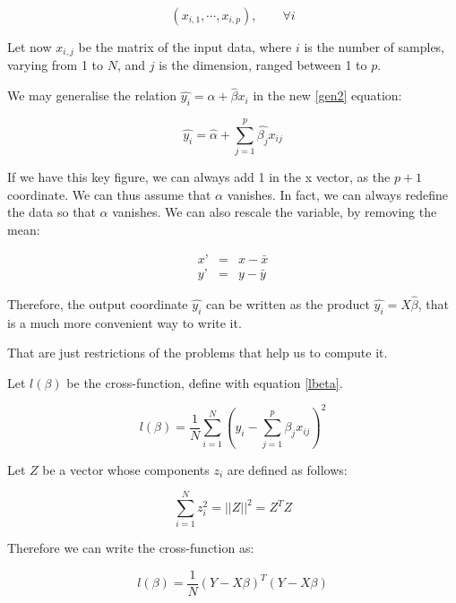 \documentclass[a4paper]{tufte-book}
\begin{document}
\begin{equation}
    (x_{i,1}, \cdots , x_{i,p}), \qquad \forall i
    \label{pdim}
\end{equation}

Let now $x_{i,j}$ be the matrix of the input data, where $i$ is the number of
samples, varying from 1 to $N$, and $j$ is the dimension, ranged between 1 to
$p$.

We may generalise the relation $\hat{y_i} = \hat{\alpha} + \hat{\beta}x_i$ in
the new \ref{gen2} equation: 

\begin{equation} 
    \hat{y_i} = \hat{\alpha} + \sum_{j=1}^p \hat{\beta_j} x_{ij}
    \label{gen2}
\end{equation}

If we have this key figure, we can always add 1 in the x vector, as the $p+1$
coordinate. We can thus assume that $\alpha$ vanishes. In fact, we can always
redefine the data so that $\alpha$ vanishes. We can also rescale the variable, by
removing the mean:

\begin{eqnarray}
x’&=& x-\bar{x}\\
y’&=& y-\bar{y}
\end{eqnarray}

Therefore, the output coordinate $\hat{y_i}$ can be written as the product
$\hat{y_i} = X \hat{\beta}$, that is a much more convenient way to write it.

That are just restrictions of the problems that help us to compute it.

Let $l(\beta)$ be the cross-function, define with equation \ref{lbeta}.

\begin{equation}
    l(\beta) = \frac{1}{N} \sum_{i=1}^N \left( y_i - \sum_{j=1}^p \beta_j x_{ij} \right)^2
    \label{lbeta}
\end{equation}


Let $Z$ be a vector whose components $z_i$ are defined as follows:

\begin{equation}
    \sum_{i=1}^N z_i^2 = ||Z||^2 = Z^TZ
\end{equation}

Therefore we can write the cross-function as:

\begin{equation}
    l(\beta) = \frac{1}{N} (Y-X\beta)^T(Y-X\beta)
\end{equation}
\end{document}
